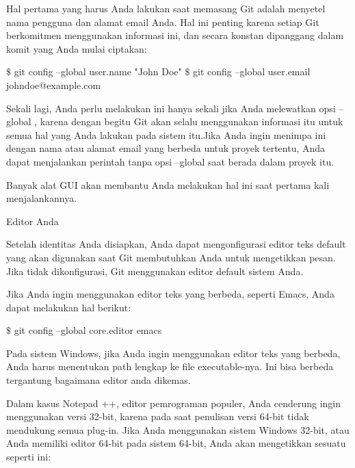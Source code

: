 \vspace{12pt}
\noindent 
Hal pertama yang harus Anda lakukan saat memasang Git adalah menyetel nama pengguna dan alamat email Anda. $  $Hal ini penting karena setiap Git berkomitmen menggunakan informasi ini, dan secara konstan dipanggang dalam komit yang Anda mulai ciptakan: \par
\vspace{12pt}
\noindent 
  $  \$  $ git config --global user.name "John Doe"  $  \$  $ git config --global user.email johndoe@example.com \par
\vspace{12pt}
\noindent 
Sekali lagi, Anda perlu melakukan ini hanya sekali jika Anda melewatkan opsi $  $--global $  $, karena dengan begitu Git akan selalu menggunakan informasi itu untuk semua hal yang Anda lakukan pada sistem itu.Jika Anda ingin menimpa ini dengan nama atau alamat email yang berbeda untuk proyek tertentu, Anda dapat menjalankan perintah tanpa opsi $  $--global $  $saat berada dalam proyek itu. \par
\vspace{12pt}
\noindent 
Banyak alat GUI akan membantu Anda melakukan hal ini saat pertama kali menjalankannya. \par
\vspace{12pt}
\noindent 
Editor Anda \par
\vspace{12pt}
\noindent 
Setelah identitas Anda disiapkan, Anda dapat mengonfigurasi editor teks default yang akan digunakan saat Git membutuhkan Anda untuk mengetikkan pesan. $  $Jika tidak dikonfigurasi, Git menggunakan editor default sistem Anda. \par
\vspace{12pt}
\noindent 
Jika Anda ingin menggunakan editor teks yang berbeda, seperti Emacs, Anda dapat melakukan hal berikut: \par
\vspace{12pt}
\noindent 
  $  \$  $ git config --global core.editor emacs  \par
\vspace{12pt}
\noindent 
Pada sistem Windows, jika Anda ingin menggunakan editor teks yang berbeda, Anda harus menentukan path lengkap ke file executable-nya. $  $Ini bisa berbeda tergantung bagaimana editor anda dikemas. \par
\vspace{12pt}
\noindent 
Dalam kasus Notepad ++, editor pemrograman populer, Anda cenderung ingin menggunakan versi 32-bit, karena pada saat penulisan versi 64-bit tidak mendukung semua plug-in. $  $Jika Anda menggunakan sistem Windows 32-bit, atau Anda memiliki editor 64-bit pada sistem 64-bit, Anda akan mengetikkan sesuatu seperti ini: \par
